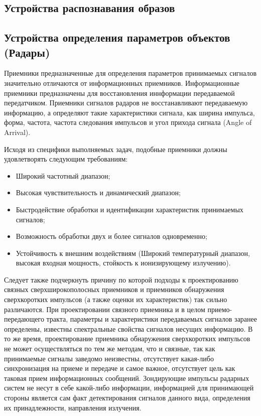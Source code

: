 \subsection{Устройства распознавания образов}

\subsection{Устройства определения параметров объектов (Радары)}
Приемники предназначенные для определения параметров принимаемых сигналов значительно отличаются от информационных приемников. Информационные приемники предназначены для восстановления иннформации передаваемой передатчиком. Приемники сигналов радаров не восстанавливают передаваемую информацию, а определяют такие характеристики сигнала, как ширина импульса, форма, частота, частота следования импульсов и угол прихода сигнала (Angle of Arrival).

Исходя из специфики выполняемых задач, подобные приемники должны удовлетворять следующим требованиям:
\begin{itemize}
\item Широкий частотный диапазон;

\item Высокая чувствительность и динамический диапазон;

\item Быстродействие обработки и идентификации характеристик принимаемых сигналов;

\item Возможность обработки двух и более сигналов одновременно;

\item Устойчивость к внешним воздействиям (Широкий температурный диапазон, высокая входная мощность, стойкость к ионизирующему излучению).
\end{itemize}

 Следует также подчеркнуть причину по которой подходы к проектированию связных сверхширокополосных приемников и приемников обнаружения сверхкоротких импульсов (а также оценки их характеристик) так сильно различаются. При проектировании связного приемника и в целом приемо-передающего тракта, параметры и характеристики передаваемых сигналов заранее определены, известны спектральные свойства сигналов несущих информацию.
 В то же время, проектирование приемника обнаружения сверхкоротких импульсов не может осуществляться по тем же методам, что и связные, так как принимаемые сигналы заведомо неизвестны, отсутствует какая-либо синхронизация на приеме и передаче и самое важное, отсутствует цель как таковая прием информационных сообщений. Зондирующие импульсы радарных систем не несут в себе какой-либо информации, информацией для принимающей стороны является сам факт детектирования сигналов данного вида, определения их принадлежности, направления излучения.

